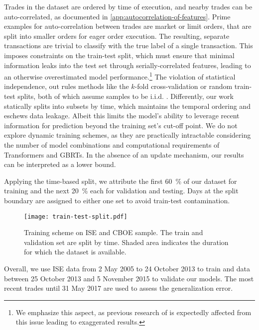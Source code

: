 Trades in the dataset are ordered by time of execution, and nearby trades can be auto-correlated, as documented in \cref{app:autocorrelation-of-features}.
Prime examples for auto-correlation between trades are market or limit orders, that are split into smaller orders for eager order execution. 
The resulting, separate transactions are trivial to classify with the true label of a single transaction. This imposes constraints on the train-test split, which must ensure that minimal information leaks into the test set through serially-correlated features, leading to an otherwise overestimated model performance.\footnote{We emphasize this aspect, as previous research of \textcite[\checkmark][14]{ronenMachineLearningTrade2022} is expectedly affected from this issue leading to exaggerated results.} The violation of statistical independence, out rules methods like the $k$-fold cross-validation or random train-test splits, both of which assume samples to be i.i.d. \autocite[\checkmark][103--105]{lopezdepradoAdvancesFinancialMachine2018}. Differently, our work statically splits into subsets by time, which maintains the temporal ordering and eschews data leakage. Albeit this limits the model's ability to leverage recent information for prediction beyond the training set's cut-off point. We do not explore dynamic training schemes, as they are practically intractable considering the number of model combinations and computational requirements of Transformers and \glspl{GBRT}. In the absence of an update mechanism, our results can be interpreted as a lower bound.

Applying the time-based split, we attribute the first \SI{60}{\percent} of our dataset for training and the next \SI{20}{\percent} each for validation and testing. Days at the split boundary are assigned to either one set to avoid train-test contamination.

\begin{figure}[ht]
    \centering
    \texttt{[image: train-test-split.pdf]}
    \caption[Training Scheme on  and  Sample]{Training scheme on \gls{ISE} and \gls{CBOE} sample. The train and validation set are split by time. Shaded area  indicates the duration for which the dataset is available.}
    \label{fig:train-test-split}
\end{figure}

Overall, we use \gls{ISE} data from 2 May 2005 to 24 October 2013 to train and data between 25 October 2013 and 5 November 2015 to validate our models. The most recent trades until 31 May 2017 are used to assess the generalization error.

